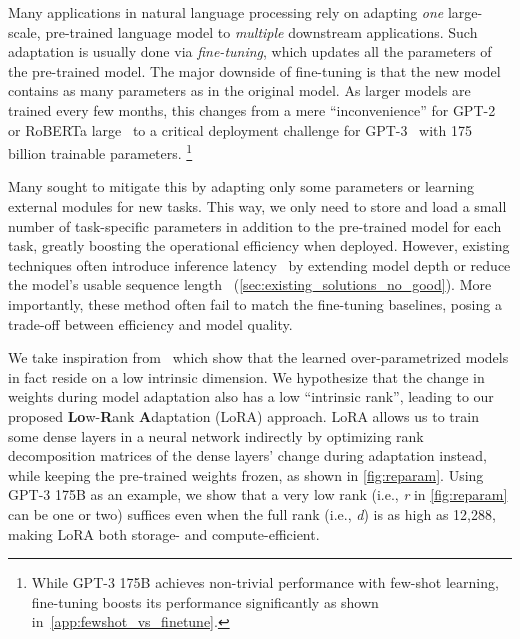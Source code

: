 \documentclass{article} %
\begin{document}
Many applications in natural language processing rely on adapting \emph{one} large-scale, pre-trained language model to \emph{multiple} downstream applications.
Such adaptation is usually done via \emph{fine-tuning}, which updates all the parameters of the pre-trained model.
The major downside of fine-tuning is that the new model contains as many parameters as in the original model.
As larger models are trained every few months, this changes from a mere ``inconvenience'' for GPT-2~\citep{radford_language_nodate} or RoBERTa large~\citep{liu2019roberta} to a critical deployment challenge for GPT-3~\citep{brown_language_2020} with 175 billion trainable parameters.%
\footnote{While GPT-3 175B achieves non-trivial performance with few-shot learning, fine-tuning boosts its performance significantly as shown in~\autoref{app:fewshot_vs_finetune}.}





Many sought to mitigate this by adapting only some parameters or learning external modules for new tasks.
This way, we only need to store and load a small number of task-specific parameters in addition to the pre-trained model for each task, greatly boosting the operational efficiency when deployed.
However, existing techniques often introduce inference latency~\citep{houlsby_parameter-efficient_2019, rebuffi_learning_2017} by extending model depth or reduce the model's usable sequence length~\citep{li_prefix-tuning_2021, lester_power_2021, hambardzumyan_warp_2020, liu_gpt_2021} (\autoref{sec:existing_solutions_no_good}).
More importantly, these method often fail to match the fine-tuning baselines, posing a trade-off between efficiency and model quality.


We take inspiration from~\cite{li_measuring_2018, aghajanyan_intrinsic_2020} which show that the learned over-parametrized models in fact reside on a low intrinsic dimension.
We hypothesize that the change in weights during model adaptation also has a low ``intrinsic rank'', leading to our proposed \textbf{Lo}w-\textbf{R}ank \textbf{A}daptation (LoRA) approach.
LoRA allows us to train some dense layers in a neural network indirectly by optimizing rank decomposition matrices of the dense layers' change during adaptation instead, while keeping the pre-trained weights frozen, as shown in \autoref{fig:reparam}.
Using GPT-3 175B as an example, we show that a very low rank (i.e., \textit{r} in \autoref{fig:reparam} can be one or two) suffices even when the full rank (i.e., \textit{d}) is as high as 12,288, making LoRA both storage- and compute-efficient.
\end{document}
